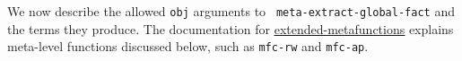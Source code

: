 
We now describe the allowed {\tt obj} arguments to {\tt
  meta-extract-global-fact} and the terms they produce.  The
documentation for
\href{http://www.cs.utexas.edu/users/moore/acl2/manuals/current/manual/index.html?topic=ACL2\_\_\_\_EXTENDED-METAFUNCTIONS}{\underline{extended-metafunctions}}
explains meta-level functions discussed below, such as {\tt mfc-rw}
and {\tt mfc-ap}.

